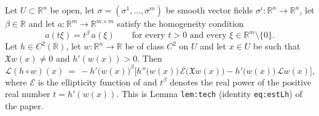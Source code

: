 \begin{lemma}
Let $U\subset\mathbb{R}^n$ be open, let $\sigma=(\sigma^1,\dots,\sigma^m)$ be smooth vector fields
$\sigma^i:\mathbb{R}^n\to\mathbb{R}^n$, let $\beta\in\mathbb{R}$ and let
$a:\mathbb{R}^m\to\mathbb{R}^{m\times m}$ satisfy the homogeneity condition
$$a(t\xi)=t^\beta\,a(\xi)\qquad\text{for every }t>0\text{ and every }
\xi\in\mathbb{R}^m\setminus\{0\}.$$
Let $h\in C^2(\mathbb{R})$, let $w:\mathbb{R}^n\to\mathbb{R}$ be of class $C^2$ on $U$ and let
$x\in U$ be such that $\mathfrak{X}w(x)\neq0$ and $h'(w(x))>0$. Then
$$\mathcal{L}(h\circ w)(x)\ =\ -h'\big(w(x)\big)^{\beta}
\Big[h''\big(w(x)\big)\,\mathcal{E}\big(\mathfrak{X}w(x)\big)
-h'\big(w(x)\big)\,\mathcal{L}w(x)\Big],$$
where $\mathcal{E}$ is the ellipticity function of  and $t^\beta$ denotes
the real power of the positive real number $t=h'(w(x))$. This is Lemma \texttt{lem:tech}
(identity \texttt{eq:estLh}) of the paper.
\end{lemma}
